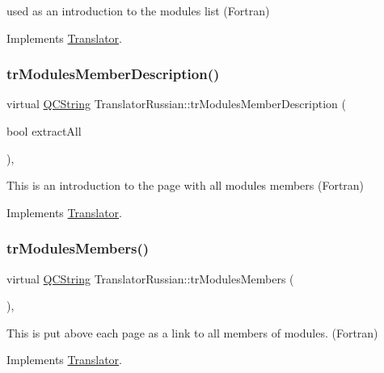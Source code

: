 used as an introduction to the modules list (Fortran) 

Implements \mbox{\hyperlink{class_translator}{Translator}}.

\mbox{\label{class_translator_russian_ad1835749333106167694995689fa365f}} 
\subsubsection{\texorpdfstring{trModulesMemberDescription()}{trModulesMemberDescription()}}
{\footnotesize\ttfamily virtual \mbox{\hyperlink{class_q_c_string}{Q\+C\+String}} Translator\+Russian\+::tr\+Modules\+Member\+Description (\begin{DoxyParamCaption}\item[{bool}]{extract\+All }\end{DoxyParamCaption})\hspace{0.3cm}{\ttfamily [inline]}, {\ttfamily [virtual]}}

This is an introduction to the page with all modules members (Fortran) 

Implements \mbox{\hyperlink{class_translator}{Translator}}.

\mbox{\label{class_translator_russian_afb01793098ece2a84aad8faeccf6f5d0}} 
\subsubsection{\texorpdfstring{trModulesMembers()}{trModulesMembers()}}
{\footnotesize\ttfamily virtual \mbox{\hyperlink{class_q_c_string}{Q\+C\+String}} Translator\+Russian\+::tr\+Modules\+Members (\begin{DoxyParamCaption}{ }\end{DoxyParamCaption})\hspace{0.3cm}{\ttfamily [inline]}, {\ttfamily [virtual]}}

This is put above each page as a link to all members of modules. (Fortran) 

Implements \mbox{\hyperlink{class_translator}{Translator}}.


